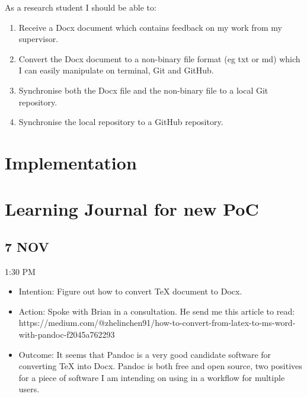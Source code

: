 \documentclass{article}
\begin{document}
As a research student I should be able to:

\begin{enumerate}
    \item Receive a Docx document which contains feedback on my work from my supervisor.
    \item Convert the Docx document to a non-binary file format (eg txt or md) which I can easily manipulate on terminal, Git and GitHub.
    \item Synchronise both the Docx file and the non-binary file to a local Git repository.
    \item Synchronise the local repository to a GitHub repository.
\end{enumerate}

\section{Implementation}



\section{Learning Journal for new PoC}

\subsection{7 NOV}

1:30 PM
\begin{itemize}
    \item Intention: Figure out how to convert TeX document to Docx.
    \item Action: Spoke with Brian in a consultation. He send me this article to read: https://medium.com/@zhelin\-chen91/how-to-convert-from-latex-to-ms-word-with-pandoc-f2045a762293
    \item Outcome: It seems that Pandoc is a very good candidate software for converting TeX into Docx. Pandoc is both free and open source, two positives for a piece of software I am intending on using in a workflow for multiple users.
\end{itemize}
\end{document}
